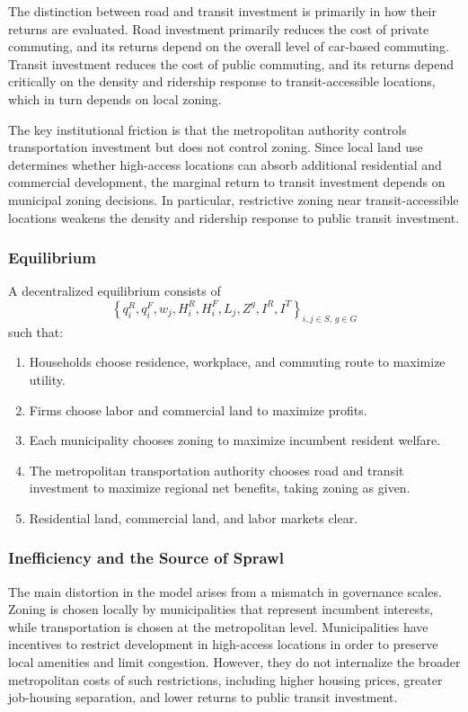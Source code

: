 \documentclass[12pt, a4paper]{article}
\begin{document}
The distinction between road and transit investment is primarily in how their returns are evaluated. Road investment primarily reduces the cost of private commuting, and its returns depend on the overall level of car-based commuting. Transit investment reduces the cost of public commuting, and its returns depend critically on the density and ridership response to transit-accessible locations, which in turn depends on local zoning.

The key institutional friction is that the metropolitan authority controls transportation investment but does not control zoning. Since local land use determines whether high-access locations can absorb additional residential and commercial development, the marginal return to transit investment depends on municipal zoning decisions. In particular, restrictive zoning near transit-accessible locations weakens the density and ridership response to public transit investment.

\subsubsection{Equilibrium}

A decentralized equilibrium consists of
\[
\left\{
q_i^R, q_i^F, w_j, H_i^R, H_i^F, L_j, Z^g, I^R, I^T
\right\}_{i,j\in S,\, g\in G}
\]
such that:

\begin{enumerate}
    \item Households choose residence, workplace, and commuting route to maximize utility.
    \item Firms choose labor and commercial land to maximize profits.
    \item Each municipality chooses zoning to maximize incumbent resident welfare.
    \item The metropolitan transportation authority chooses road and transit investment to maximize regional net benefits, taking zoning as given.
    \item Residential land, commercial land, and labor markets clear.
\end{enumerate}

\subsubsection{Inefficiency and the Source of Sprawl}

The main distortion in the model arises from a mismatch in governance scales. Zoning is chosen locally by municipalities that represent incumbent interests, while transportation is chosen at the metropolitan level. Municipalities have incentives to restrict development in high-access locations in order to preserve local amenities and limit congestion. However, they do not internalize the broader metropolitan costs of such restrictions, including higher housing prices, greater job-housing separation, and lower returns to public transit investment.
\end{document}
